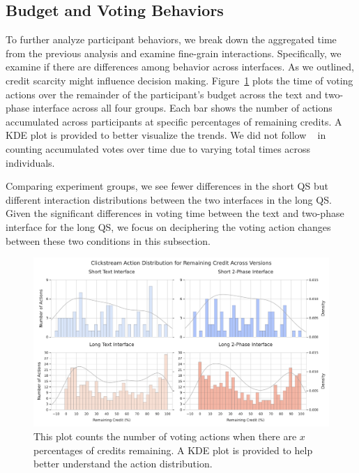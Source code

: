 \subsection{Budget and Voting Behaviors}
To further analyze participant behaviors, we break down the aggregated time from the previous analysis and examine fine-grain interactions. Specifically, we examine if there are differences among behavior across interfaces. As we outlined, credit scarcity might influence decision making.  Figure~\ref{fig:voting_all} plots the time of voting actions over the remainder of the participant's budget across the text and two-phase interface across all four groups. Each bar shows the number of actions accumulated across participants at specific percentages of remaining credits. A KDE plot is provided to better visualize the trends. We did not follow ~\textcite{quarfoot2017quadratic} in counting accumulated votes over time due to varying total times across individuals.

Comparing experiment groups, we see fewer differences in the short QS but different interaction distributions between the two interfaces in the long QS. Given the significant differences in voting time between the text and two-phase interface for the long QS, we focus on deciphering the voting action changes between these two conditions in this subsection.

\begin{figure}[ht]
    \centering
    \includegraphics[width=\textwidth]{content/image/results/clickstream_action_distribution.pdf}
    \caption{This plot counts the number of voting actions when there are $x$ percentages of credits remaining. A KDE plot is provided to help better understand the action distribution.}
    \label{fig:voting_all}
\end{figure}

